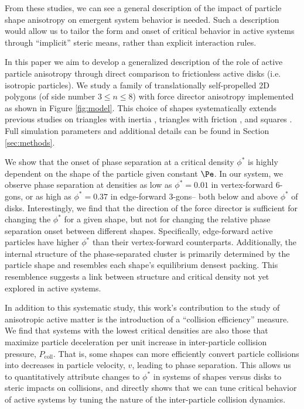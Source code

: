 From these studies, we can see a general description of the impact of particle shape anisotropy on emergent system behavior is needed.
Such a description would allow us to tailor the form and onset of critical behavior in active systems through ``implicit'' steric means, rather than explicit interaction rules.

In this paper we aim to develop a generalized description of the role of active particle anisotropy through direct comparison to frictionless active disks (i.e. isotropic particles).
We study a family of translationally self-propelled 2D polygons (of side number $3{\leq}n{\leq}8$) with force director anisotropy implemented as shown in Figure \ref{fig:model}.
This choice of shapes systematically extends previous studies on triangles with inertia \cite{Wensink_2014_PRE}, triangles with friction \cite{Ilse_2016_JChemPhys}, and squares \cite{Prymidis_2016_SoftMatter}.
Full simulation parameters and additional details can be found in Section \ref{sec:methods}.

We show that the onset of phase separation at a critical density $\phi^*$ is highly dependent on the shape of the particle given constant $\Pe$.
In our system, we observe phase separation at densities as low as $\phi^*=0.01$ in vertex-forward 6-gons, or as high as $\phi^*=0.37$ in edge-forward 3-gons-- both below and above $\phi^*$ of disks.
Interestingly, we find that the direction of the force director is sufficient for changing the $\phi^*$ for a given shape, but not for changing the relative phase separation onset between different shapes.
Specifically, edge-forward active particles have higher $\phi^*$ than their vertex-forward counterparts.
Additionally, the internal structure of the phase-separated cluster is primarily determined by the particle shape and resembles each shape's equilibrium densest packing.
This resemblence suggests a link between structure and critical density not yet explored in active systems.

In addition to this systematic study, this work's contribution to the study of anisotropic active matter is the introduction of a ``collision efficiency'' measure.
We find that systems with the lowest critical densities are also those that maximize particle deceleration per unit increase in inter-particle collision pressure, $P_\text{coll}$.
That is, some shapes can more efficiently convert particle collisions into decreases in particle velocity, $v$, leading to phase separation.
This allows us to quantitatively attribute changes to $\phi^*$ in systems of shapes versus disks to steric impacts on collisions, and directly shows that we can tune critical behavior of active systems by tuning the nature of the inter-particle collision dynamics.

